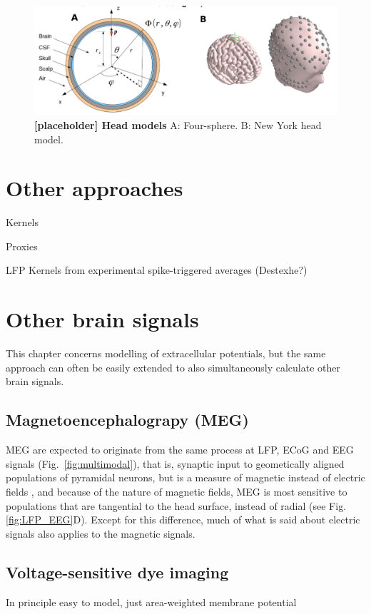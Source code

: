 \documentclass[preprint,11pt,authoryear]{elsarticle}
\begin{document}
\begin{figure}[!ht]
\begin{center}
\includegraphics[width=1\textwidth]{head_models.png}
\end{center}
\caption{\textbf{[placeholder] Head models} A: Four-sphere. B: New York head model.}
\label{fig:head_models}
\end{figure}



\section{Other approaches}
Kernels \citep{Hagen2016}

Proxies \cite{Mazzoni2015}

LFP Kernels from experimental spike-triggered averages (Destexhe?)


\section{Other brain signals}
This chapter concerns modelling of extracellular potentials, but the same approach can often be easily extended to also simultaneously calculate other brain signals.

\subsection*{Magnetoencephalograpy (MEG)}
MEG are expected to originate from the same process at LFP, ECoG and EEG signals (Fig.~\ref{fig:multimodal}), that is, synaptic input
to geometically aligned populations of pyramidal neurons, but
is a measure of magnetic instead of electric fields \citep{Hamalainen1993}, and because of the nature of magnetic fields, MEG is most sensitive to populations that are tangential to the head surface, instead of radial (see Fig. \ref{fig:LFP_EEG}D). Except for this difference, much of what is said about electric signals also applies to the magnetic signals.
\subsection*{Voltage-sensitive dye imaging}
In principle easy to model, just area-weighted membrane potential
\end{document}
